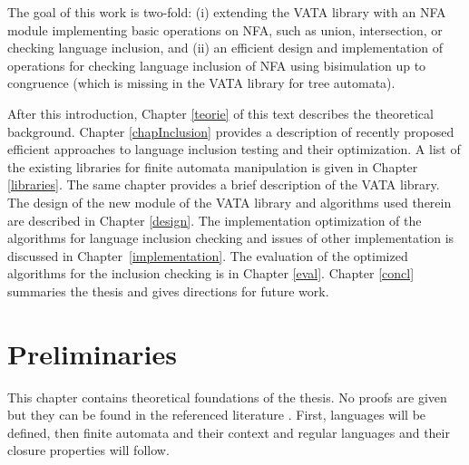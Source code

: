 The goal of this work is two-fold: (i) extending the VATA library with an NFA module implementing basic operations on NFA, such as union, intersection, or 
checking language inclusion, and (ii) an efficient design and implementation of operations for checking language inclusion of NFA using 
bisimulation up to congruence (which is missing in the VATA library for tree automata).

After this introduction, Chapter \ref{teorie} of this text describes the theoretical background. 
Chapter \ref{chapInclusion} provides a description of recently proposed 
efficient approaches to language inclusion testing and their optimization.
A list of the existing libraries for finite automata manipulation is given in Chapter \ref{libraries}. The same chapter
provides a brief description of the VATA library.
The design of the new module of the VATA library and algorithms used therein are described in Chapter \ref{design}. 
The implementation optimization of the algorithms for language inclusion checking and issues of other implementation is discussed in Chapter~\ref{implementation}.
The evaluation of the optimized algorithms for the inclusion checking is in Chapter \ref{eval}. Chapter \ref{concl} summaries the thesis and gives directions for
future work.

\chapter{Preliminaries}
This chapter contains theoretical foundations of the thesis. No proofs are given but they can be found in the referenced literature \cite{kozen,ullman}. 
First, languages will be defined, then finite automata and their context and regular languages and their closure properties will follow. 
\label{teorie}

